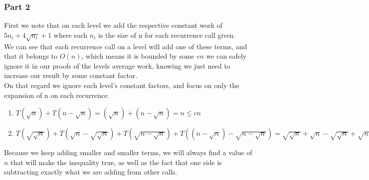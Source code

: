 \documentclass{article}
\begin{document}
      \subsubsection{Part 2}
        First we note that on each level we add the respective constant work of $5n_{i} + 4\sqrt{n_{i}} + 1$ where each $n_{i}$ is the size of n for each recurrence call given.\\
        We can see that each recurrence call on a level will add one of these terms, and that it belongs to $O(n)$, which means it is bounded by some $cn$ we can safely ignore it in our proofs of the levels average work, knowing we just need to increase our result by some constant factor. \\
        On that regard we ignore each level's constant factors, and focus on only the expansion of n on each recurrence.\\
        \begin{enumerate}
          \item $            T(\sqrt{n})                           +        T(n - \sqrt{n}) = (\sqrt{n}) + (n - \sqrt{n}) = n \leq cn$
          \item $T(\sqrt{\sqrt{n}}) + T(\sqrt{n} - \sqrt{\sqrt{n}}) + T(\sqrt{n - \sqrt{n}}) + T((n-\sqrt{n}) - \sqrt{n-\sqrt{n}}) = \sqrt{\sqrt{n}} + \sqrt{n} - \sqrt{\sqrt{n}} + \sqrt{n - \sqrt{n}} + n-\sqrt{n} - \sqrt{n - \sqrt{n}} = n \leq cn$
        \end{enumerate}
        Because we keep adding smaller and smaller terms, we will always find a value of $n$ that will make the inequality true, as well as the fact that one side is subtracting exactly what we are adding from other calls.
\end{document}
